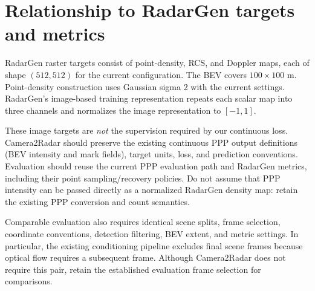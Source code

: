 \documentclass[11pt,a4paper]{article}
\begin{document}
\section{Relationship to RadarGen targets and metrics}
RadarGen raster targets consist of point-density, RCS, and Doppler maps, each of shape $(512,512)$ for the current configuration. The BEV covers $100\times100$ m. Point-density construction uses Gaussian sigma 2 with the current settings. RadarGen's image-based training representation repeats each scalar map into three channels and normalizes the image representation to $[-1,1]$.

These image targets are \emph{not} the supervision required by our continuous loss. Camera2Radar should preserve the existing continuous PPP output definitions (BEV intensity and mark fields), target units, loss, and prediction conventions. Evaluation should reuse the current PPP evaluation path and RadarGen metrics, including their point sampling/recovery policies. Do not assume that PPP intensity can be passed directly as a normalized RadarGen density map: retain the existing PPP conversion and count semantics.

Comparable evaluation also requires identical scene splits, frame selection, coordinate conventions, detection filtering, BEV extent, and metric settings. In particular, the existing conditioning pipeline excludes final scene frames because optical flow requires a subsequent frame. Although Camera2Radar does not require this pair, retain the established evaluation frame selection for comparisons.
\end{document}
